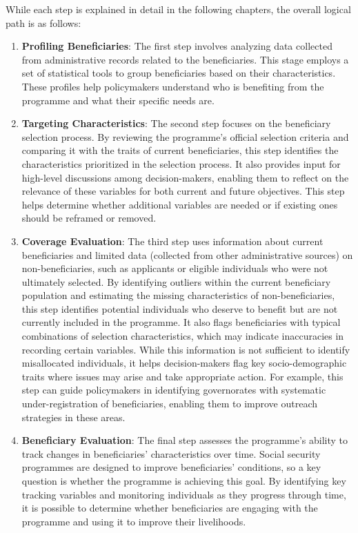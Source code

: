 \documentclass[
]{article}
\begin{document}
While each step is explained in detail in the following chapters, the
overall logical path is as follows:

\begin{enumerate}
\def\labelenumi{\arabic{enumi}.}
\item
  \textbf{Profiling Beneficiaries}: The first step involves analyzing
  data collected from administrative records related to the
  beneficiaries. This stage employs a set of statistical tools to group
  beneficiaries based on their characteristics. These profiles help
  policymakers understand who is benefiting from the programme and what
  their specific needs are.
\item
  \textbf{Targeting Characteristics}: The second step focuses on the
  beneficiary selection process. By reviewing the programme's official
  selection criteria and comparing it with the traits of current
  beneficiaries, this step identifies the characteristics prioritized in
  the selection process. It also provides input for high-level
  discussions among decision-makers, enabling them to reflect on the
  relevance of these variables for both current and future objectives.
  This step helps determine whether additional variables are needed or
  if existing ones should be reframed or removed.
\item
  \textbf{Coverage Evaluation}: The third step uses information about
  current beneficiaries and limited data (collected from other
  administrative sources) on non-beneficiaries, such as applicants or
  eligible individuals who were not ultimately selected. By identifying
  outliers within the current beneficiary population and estimating the
  missing characteristics of non-beneficiaries, this step identifies
  potential individuals who deserve to benefit but are not currently
  included in the programme. It also flags beneficiaries with typical
  combinations of selection characteristics, which may indicate
  inaccuracies in recording certain variables. While this information is
  not sufficient to identify misallocated individuals, it helps
  decision-makers flag key socio-demographic traits where issues may
  arise and take appropriate action. For example, this step can guide
  policymakers in identifying governorates with systematic
  under-registration of beneficiaries, enabling them to improve outreach
  strategies in these areas.
\item
  \textbf{Beneficiary Evaluation}: The final step assesses the
  programme's ability to track changes in beneficiaries' characteristics
  over time. Social security programmes are designed to improve
  beneficiaries' conditions, so a key question is whether the programme
  is achieving this goal. By identifying key tracking variables and
  monitoring individuals as they progress through time, it is possible
  to determine whether beneficiaries are engaging with the programme and
  using it to improve their livelihoods.


\end{enumerate}
\end{document}
